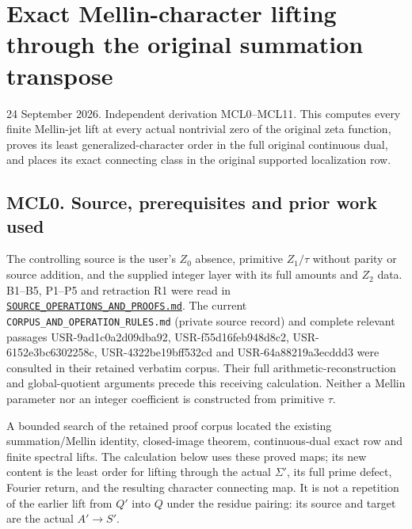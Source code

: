\section{Exact Mellin-character lifting through the original summation
transpose}\label{exact-mellin-character-lifting-through-the-original-summation-transpose}

24 September 2026. Independent derivation MCL0--MCL11. This computes
every finite Mellin-jet lift at every actual nontrivial zero of the
original zeta function, proves its least generalized-character order in
the full original continuous dual, and places its exact connecting class
in the original supported localization row.

\subsection{MCL0. Source, prerequisites and prior work
used}\label{mcl0.-source-prerequisites-and-prior-work-used}

The controlling source is the user's \(Z_0\) absence, primitive
\(Z_1/\tau\) without parity or source addition, and the supplied integer
layer with its full amounts and \(Z_2\) data. B1--B5, P1--P5 and
retraction R1 were read in
\href{../foundations/user_definitions_20260924/SOURCE_OPERATIONS_AND_PROOFS.md}{\nolinkurl{SOURCE_OPERATIONS_AND_PROOFS.md}}.
The current \nolinkurl{CORPUS_AND_OPERATION_RULES.md} (private source record) and complete relevant
passages USR-9ad1c0a2d09dba92, USR-f55d16feb948d8c2,
USR-6152e3bc6302258c, USR-4322be19bff532cd and USR-64a88219a3ecddd3 were
consulted in their retained verbatim corpus. Their full
arithmetic-reconstruction and global-quotient arguments precede this
receiving calculation. Neither a Mellin parameter nor an integer
coefficient is constructed from primitive \(\tau\).

A bounded search of the retained proof corpus located the existing
summation/Mellin identity, closed-image theorem, continuous-dual exact
row and finite spectral lifts. The calculation below uses these proved
maps; its new content is the least order for lifting through the actual
\(\Sigma'\), its full prime defect, Fourier return, and the resulting
character connecting map. It is not a repetition of the earlier lift
from \(Q'\) into \(Q\) under the residue pairing: its source and target
are the actual \(A'\to S'\).

